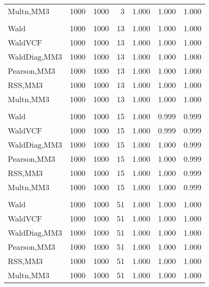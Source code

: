 \documentclass[
]{article}
\begin{document}
\begin{table}[H]
{\begin{tabular}[t]{lrrrrrr}
\hspace{1em}Multn,MM3 & 1000 & 1000 & 3 & 1.000 & 1.000 & 1.000\\
\addlinespace[0.3em]
\multicolumn{7}{l}{\textbf{1F 15V}}\\
\hspace{1em}Wald & 1000 & 1000 & 13 & 1.000 & 1.000 & 1.000\\
\hspace{1em}WaldVCF & 1000 & 1000 & 13 & 1.000 & 1.000 & 1.000\\
\hspace{1em}WaldDiag,MM3 & 1000 & 1000 & 13 & 1.000 & 1.000 & 1.000\\
\hspace{1em}Pearson,MM3 & 1000 & 1000 & 13 & 1.000 & 1.000 & 1.000\\
\hspace{1em}RSS,MM3 & 1000 & 1000 & 13 & 1.000 & 1.000 & 1.000\\
\hspace{1em}Multn,MM3 & 1000 & 1000 & 13 & 1.000 & 1.000 & 1.000\\
\addlinespace[0.3em]
\multicolumn{7}{l}{\textbf{2F 10V}}\\
\hspace{1em}Wald & 1000 & 1000 & 15 & 1.000 & 0.999 & 0.999\\
\hspace{1em}WaldVCF & 1000 & 1000 & 15 & 1.000 & 0.999 & 0.999\\
\hspace{1em}WaldDiag,MM3 & 1000 & 1000 & 15 & 1.000 & 1.000 & 0.999\\
\hspace{1em}Pearson,MM3 & 1000 & 1000 & 15 & 1.000 & 1.000 & 0.999\\
\hspace{1em}RSS,MM3 & 1000 & 1000 & 15 & 1.000 & 1.000 & 0.999\\
\hspace{1em}Multn,MM3 & 1000 & 1000 & 15 & 1.000 & 1.000 & 0.999\\
\addlinespace[0.3em]
\multicolumn{7}{l}{\textbf{3F 15V}}\\
\hspace{1em}Wald & 1000 & 1000 & 51 & 1.000 & 1.000 & 1.000\\
\hspace{1em}WaldVCF & 1000 & 1000 & 51 & 1.000 & 1.000 & 1.000\\
\hspace{1em}WaldDiag,MM3 & 1000 & 1000 & 51 & 1.000 & 1.000 & 1.000\\
\hspace{1em}Pearson,MM3 & 1000 & 1000 & 51 & 1.000 & 1.000 & 1.000\\
\hspace{1em}RSS,MM3 & 1000 & 1000 & 51 & 1.000 & 1.000 & 1.000\\
\hspace{1em}Multn,MM3 & 1000 & 1000 & 51 & 1.000 & 1.000 & 1.000\\
\bottomrule
\end{tabular}}
\endgroup{}
\end{table}
\end{document}
